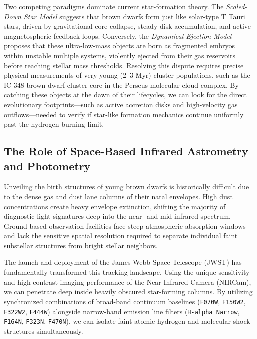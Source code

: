 \documentclass[twocolumn]{aastex63}
\begin{document}
Two competing paradigms dominate current star-formation theory. The \textit{Scaled-Down Star Model} suggests that brown dwarfs form just like solar-type T Tauri stars, driven by gravitational core collapse, steady disk accumulation, and active magnetospheric feedback loops. Conversely, the \textit{Dynamical Ejection Model} proposes that these ultra-low-mass objects are born as fragmented embryos within unstable multiple systems, violently ejected from their gas reservoirs before reaching stellar mass thresholds. Resolving this dispute requires precise physical measurements of very young (2--3 Myr) cluster populations, such as the IC 348 brown dwarf cluster core in the Perseus molecular cloud complex. By catching these objects at the dawn of their lifecycles, we can look for the direct evolutionary footprints---such as active accretion disks and high-velocity gas outflows---needed to verify if star-like formation mechanics continue uniformly past the hydrogen-burning limit.

\subsection{The Role of Space-Based Infrared Astrometry and Photometry}
Unveiling the birth structures of young brown dwarfs is historically difficult due to the dense gas and dust lane columns of their natal envelopes. High dust concentrations create heavy envelope extinction, shifting the majority of diagnostic light signatures deep into the near- and mid-infrared spectrum. Ground-based observation facilities face steep atmospheric absorption windows and lack the sensitive spatial resolution required to separate individual faint substellar structures from bright stellar neighbors.

The launch and deployment of the James Webb Space Telescope (JWST) has fundamentally transformed this tracking landscape. Using the unique sensitivity and high-contrast imaging performance of the Near-Infrared Camera (NIRCam), we can penetrate deep inside heavily obscured star-forming columns. By utilizing synchronized combinations of broad-band continuum baselines (\texttt{F070W}, \texttt{F150W2}, \texttt{F322W2}, \texttt{F444W}) alongside narrow-band emission line filters (\texttt{H-alpha Narrow}, \texttt{F164N}, \texttt{F323N}, \texttt{F470N}), we can isolate faint atomic hydrogen and molecular shock structures simultaneously.
\end{document}
